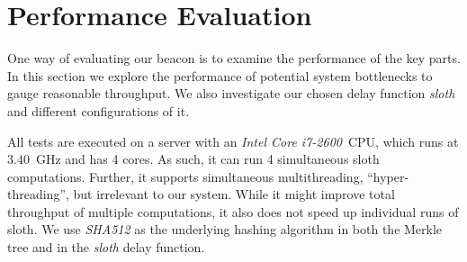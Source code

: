\section{Performance Evaluation}
One way of evaluating our beacon is to examine the performance of the key parts.
In this section we explore the performance of potential system bottlenecks to gauge reasonable throughput.
We also investigate our chosen delay function \textit{sloth} and different configurations of it.

All tests are executed on a server with an \textit{Intel Core i7-2600}~CPU, which runs at $3.40$~GHz and has 4 cores. As such, it can run 4 simultaneous sloth computations. Further, it supports simultaneous multithreading, \enquote{hyper-threading}, but irrelevant to our system. While it might improve total throughput of multiple computations, it also does not speed up individual runs of sloth.
We use \textit{SHA512} as the underlying hashing algorithm in both the Merkle tree and in the \textit{sloth} delay function.
